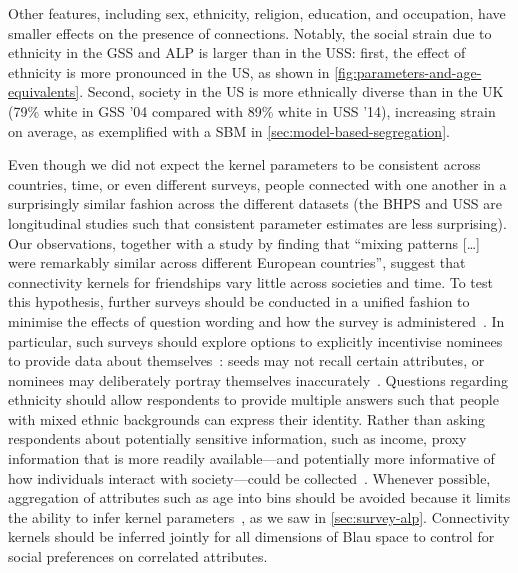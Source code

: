 \documentclass{scrartcl}
\begin{document}
\begin{refsection}
Other features, including sex, ethnicity, religion, education, and occupation, have smaller effects on the presence of connections. Notably, the social strain due to ethnicity in the GSS and ALP is larger than in the USS: first, the effect of ethnicity is more pronounced in the US, as shown in \cref{fig:parameters-and-age-equivalents}. Second, society in the US is more ethnically diverse than in the UK (79\% white in GSS '04 compared with 89\% white in USS '14), increasing strain on average, as exemplified with a SBM in \cref{sec:model-based-segregation}.

Even though we did not expect the kernel parameters to be consistent across countries, time, or even different surveys, people connected with one another in a surprisingly similar fashion across the different datasets (the BHPS and USS are longitudinal studies such that consistent parameter estimates are less surprising). Our observations, together with a study by \textcite{Mossong2008} finding that ``mixing patterns [\ldots] were remarkably similar across different European countries'', suggest that connectivity kernels for friendships vary little across societies and time. To test this hypothesis, further surveys should be conducted in a unified fashion to minimise the effects of question wording and how the survey is administered~\cite{Eagle2015}. In particular, such surveys should explore options to explicitly incentivise nominees to provide data about themselves~\cite{Biernacki1981}: seeds may not recall certain attributes, or nominees may deliberately portray themselves inaccurately~\cite{Bruch2016}. Questions regarding ethnicity should allow respondents to provide multiple answers such that people with mixed ethnic backgrounds can express their identity. Rather than asking respondents about potentially sensitive information, such as income, proxy information that is more readily available---and potentially more informative of how individuals interact with society---could be collected~\cite{Po2012}. Whenever possible, aggregation of attributes such as age into bins should be avoided because it limits the ability to infer kernel parameters~\cite{Hutcheon2010}, as we saw in \cref{sec:survey-alp}. Connectivity kernels should be inferred jointly for all dimensions of Blau space to control for social preferences on correlated attributes.


\end{refsection}
\end{document}
